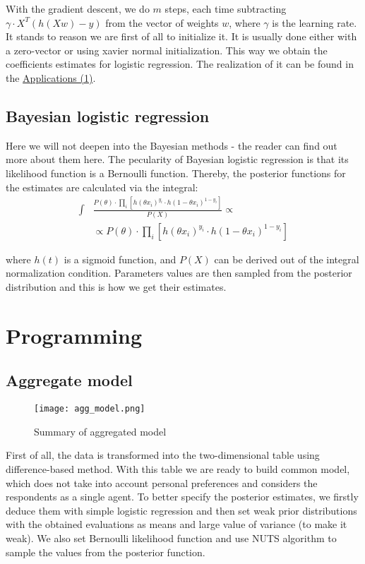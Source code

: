 \documentclass[a4paper, 12pt]{extreport}
\begin{document}
With the gradient descent, we do $m$ steps, each time subtracting $\gamma \cdot X^T(h(Xw) - y)$ from the vector of weights $w$, where $\gamma$ is the learning rate. It stands to reason we are first of all to
initialize it. It is usually done either with a zero-vector or using xavier normal initialization. This way we obtain the coefficients estimates for logistic regression. The realization of it can be found
in the \hyperref[app_1]{Applications (1)}. %

\subsection{Bayesian logistic regression}
Here we will not deepen into the Bayesian methods - the reader can find out more about them here. The pecularity of Bayesian logistic regression is that its likelihood function is a Bernoulli
function. Thereby, the posterior functions for the estimates are calculated via the integral:
\begin{align}
	\int& \frac{P(\theta) \cdot \prod_i [h(\theta x_i)^{y_i} \cdot h(1 - \theta x_i)^{1 - y_i}]}{P(X)} \propto \nonumber \\
	 &\propto P(\theta) \cdot \prod_i [h(\theta x_i)^{y_i} \cdot h(1 - \theta x_i)^{1 - y_i}]
\end{align}

where $h(t)$ is a sigmoid function, and $P(X)$ can be derived out of the integral normalization condition. Parameters values are then sampled from the posterior distribution and this is how we get their estimates.

\section{Programming}

\subsection{Aggregate model}

\begin{wrapfigure}{r}{0.5\textwidth}
   \centering
   \texttt{[image: agg\_model.png]}
   \caption{Summary of aggregated model}
\end{wrapfigure}

First of all, the data is transformed into the two-dimensional table using difference-based method. With this table we are ready to build common model, which does not take into account personal preferences and considers
the respondents as a single agent. To better specify the posterior estimates, we firstly deduce them with simple logistic regression and then set weak prior distributions with the obtained evaluations as means and
large value of variance (to make it weak). We also set Bernoulli likelihood function and use NUTS algorithm to sample the values from the posterior function. %
\end{document}
